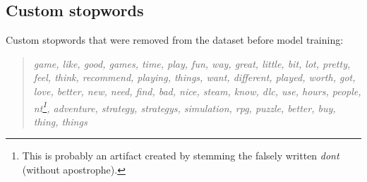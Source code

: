 \documentclass[11pt, a4paper]{article}
\newenvironment{itquote}
  {\begin{quote}\itshape}
  {\end{quote}\ignorespacesafterend}
\begin{document}
\begin{appendices}
\section{Custom stopwords}\label{sec:stops}
Custom stopwords that were removed from the dataset before model training:
\begin{itquote}
    game, like, good, games, time, play, fun, way, great, little, bit, lot, pretty, feel, think, recommend, playing,
    things, want, different, played, worth, got, love, better, new, need, find, bad, nice, steam, know, dlc, use, hours,
    people, nt\footnote{This is probably an artifact created by stemming the falsely written \textit{dont} (without
    apostrophe).}, adventure, strategy, strategys, simulation, rpg, puzzle, better, buy, thing, things
\end{itquote}
\end{appendices}
\end{document}
